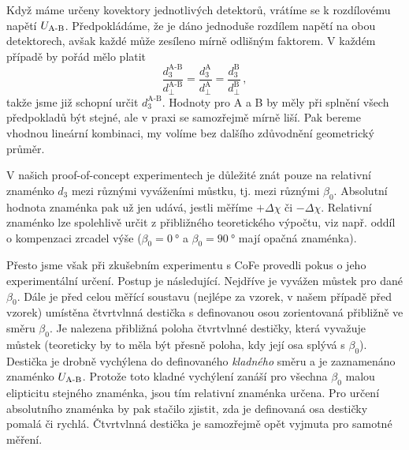 Když máme určeny kovektory jednotlivých detektorů, vrátíme se k rozdílovému napětí $U_\textrm{A-B}$.
Předpokládáme, že je dáno jednoduše rozdílem napětí na obou detektorech, avšak každé může zesíleno mírně odlišným faktorem.
V každém případě by pořád mělo platit
\begin{equation}
    \frac{d^\textrm{A-B}_3}{d^\textrm{A-B}_\perp} = \frac{d^\textrm{A}_3}{d^\textrm{A}_\perp} = \frac{d^\textrm{B}_3}{d^\textrm{B}_\perp} \,,
\end{equation}
takže jsme již schopní určit $d^\textrm{A-B}_3$.
Hodnoty pro A a B by měly při splnění všech předpokladů být stejné, ale v praxi se samozřejmě mírně liší.
Pak bereme vhodnou lineární kombinaci, my volíme bez dalšího zdůvodnění geometrický průměr.

V našich proof-of-concept experimentech je důležité znát pouze na relativní znaménko $d_3$ mezi různými vyváženími můstku, tj. mezi různými $\beta_0$.
Absolutní hodnota znaménka pak už jen udává, jestli měříme $+\Delta\chi$ či $-\Delta\chi$.
Relativní znaménko lze spolehlivě určit z přibližného teoretického výpočtu, viz např. oddíl o kompenzaci zrcadel výše ($\beta_0=\SI{0}{\degree}$ a $\beta_0=\SI{90}{\degree}$ mají opačná znaménka).

Přesto jsme však při zkušebním experimentu s CoFe provedli pokus o jeho experimentální určení.
Postup je následující.
Nejdříve je vyvážen můstek pro dané $\beta_0$.
Dále je před celou měřící soustavu (nejlépe za vzorek, v našem případě před vzorek) umístěna čtvrtvlnná destička s definovanou osou zorientovaná přibližně ve směru $\beta_0$.
Je nalezena přibližná poloha čtvrtvlnné destičky, která vyvažuje můstek (teoreticky by to měla být přesně poloha, kdy její osa splývá s $\beta_0$).
Destička je drobně vychýlena do definovaného \emph{kladného} směru a je zaznamenáno znaménko $U_\textrm{A-B}$.
Protože toto kladné vychýlení zanáší pro všechna $\beta_0$ malou elipticitu stejného znaménka, jsou tím relativní znaménka určena.
Pro určení absolutního znaménka by pak stačilo zjistit, zda je definovaná osa destičky pomalá či rychlá.
Čtvrtvlnná destička je samozřejmě opět vyjmuta pro samotné měření.

